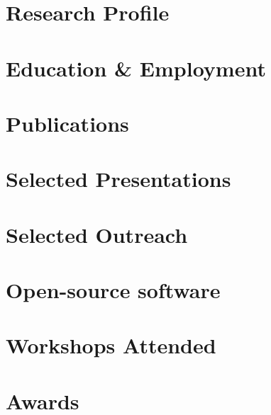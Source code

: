 \documentclass[12pt, letterpaper]{hunt-cv}
\begin{document}
\thispagestyle{plain}  %

\cvTitle

\section*{Research Profile}


\section*{Education \& Employment}


\section*{Publications}


\section*{Selected Presentations}


\section*{Selected Outreach}


\section*{Open-source software \href{\cvGitHubLink}{\faGithub}}


\section*{Workshops Attended}


\section*{Awards}

\end{document}
